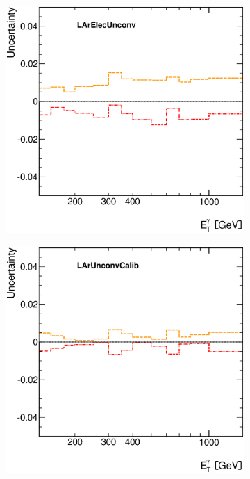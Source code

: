 \documentclass[12pt, twoside]{article}
\numberwithin{equation}{section}
\numberwithin{figure}{section}
\newenvironment{changemargin}[2]{%
\begin{list}{}{%
\setlength{\topsep}{0pt}%
\setlength{\leftmargin}{#1}%
\setlength{\rightmargin}{#2}%
\setlength{\listparindent}{\parindent}%
\setlength{\itemindent}{\parindent}%
\setlength{\parsep}{\parskip}%
}%
\item[]}{\end{list}}
\begin{document}
\begin{figure}[H]
\begin{changemargin}{-1.0cm}{-0.75cm}
\begin{changemargin}{-0.75cm}{-1.0cm}
        \begin{subfigure}[b]{0.27\textwidth}
            \includegraphics[width=\textwidth]{./images/PhotonSystematics/PhotonSystematic-9.eps}
        \end{subfigure}
        \begin{subfigure}[b]{0.27\textwidth}
            \includegraphics[width=\textwidth]{./images/PhotonSystematics/PhotonSystematic-10.eps}

\end{subfigure}
\end{changemargin}
\end{changemargin}
\end{figure}
\end{document}
